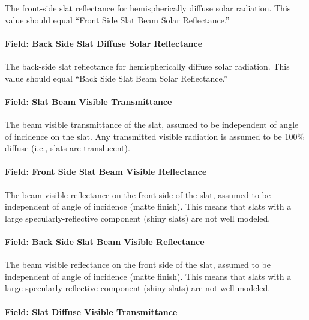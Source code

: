 The front-side slat reflectance for hemispherically diffuse solar radiation. This value should equal ``Front Side Slat Beam Solar Reflectance.''

\paragraph{Field: Back Side Slat Diffuse Solar Reflectance}\label{field-back-side-slat-diffuse-solar-reflectance}

The back-side slat reflectance for hemispherically diffuse solar radiation. This value should equal ``Back Side Slat Beam Solar Reflectance.''

\paragraph{Field: Slat Beam Visible Transmittance}\label{field-slat-beam-visible-transmittance}

The beam visible transmittance of the slat, assumed to be independent of angle of incidence on the slat. Any transmitted visible radiation is assumed to be 100\% diffuse (i.e., slats are translucent).

\paragraph{Field: Front Side Slat Beam Visible Reflectance}\label{field-front-side-slat-beam-visible-reflectance}

The beam visible reflectance on the front side of the slat, assumed to be independent of angle of incidence (matte finish). This means that slats with a large specularly-reflective component (shiny slats) are not well modeled.

\paragraph{Field: Back Side Slat Beam Visible Reflectance}\label{field-back-side-slat-beam-visible-reflectance}

The beam visible reflectance on the front side of the slat, assumed to be independent of angle of incidence (matte finish). This means that slats with a large specularly-reflective component (shiny slats) are not well modeled.

\paragraph{Field: Slat Diffuse Visible Transmittance}\label{field-slat-diffuse-visible-transmittance}

